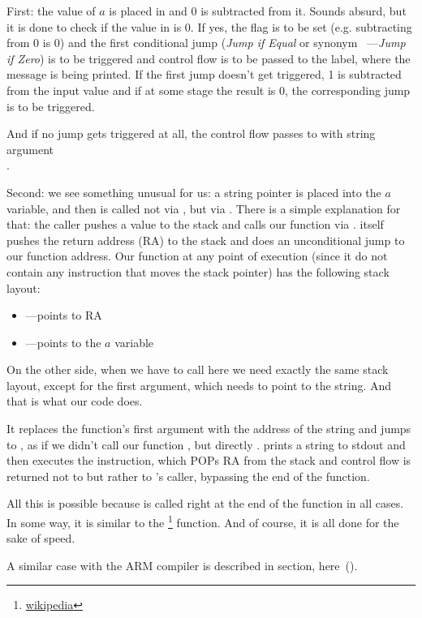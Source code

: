First: the value of $a$ is placed in \EAX and 0 is subtracted from it. Sounds absurd, but it is done to check if 
the value in \EAX is 0. If yes, the \ZF flag is to be set (e.g. subtracting from 0 is 0) 
and the first conditional jump \JE (\emph{Jump if Equal} or synonym \JZ~---\emph{Jump if Zero}) is to be triggered 
and control flow is to be passed to the  label, where the  message is being printed. 
If the first jump doesn't get triggered, 1 is subtracted from the input value and if at some stage the result is 0, 
the corresponding jump is to be triggered.

And if no jump gets triggered at all, the control flow passes to \printf with string argument \\
.

\label{jump_to_last_printf}
\myindex{\Stack}

Second: we see something unusual for us: a string pointer is placed into the $a$ variable, and 
then \printf is called not via \CALL, but via \JMP. There is a simple explanation for that: 
the \gls{caller} pushes a value to the stack and calls our function via \CALL. 
\CALL itself pushes the return address (\ac{RA}) to the stack and does an unconditional jump to our function address. 
Our function at any point of execution (since it do not contain any instruction that moves the stack 
pointer) has the following stack layout:

\begin{itemize}
\item\ESP---points to \ac{RA}
\item{}---points to the $a$ variable 
\end{itemize}

On the other side, when we have to call \printf here we need exactly the same stack 
layout, except for the first \printf argument, which needs to point to the string. 
And that is what our code does.

It replaces the function's first argument with the address of the string and 
jumps to \printf, as if we didn't call our function \ttf, but directly \printf.
\printf prints a string to \gls{stdout} and then executes the \RET instruction, which POPs 
\ac{RA} from the stack and control flow is returned not to \ttf but rather to \ttf's \gls{caller}, 
bypassing the end of the \ttf function.

\newcommand{\URLSJ}{\href{http://en.wikipedia.org/wiki/Setjmp.h}{wikipedia}}

All this is possible because \printf is called right at the end of the \ttf function in all cases. 
In some way, it is similar to the \footnote{\URLSJ} function.
And of course, it is all done for the sake of speed.

A similar case with the ARM compiler is described in \q{\PrintfSeveralArgumentsSectionName}
section, here~().



